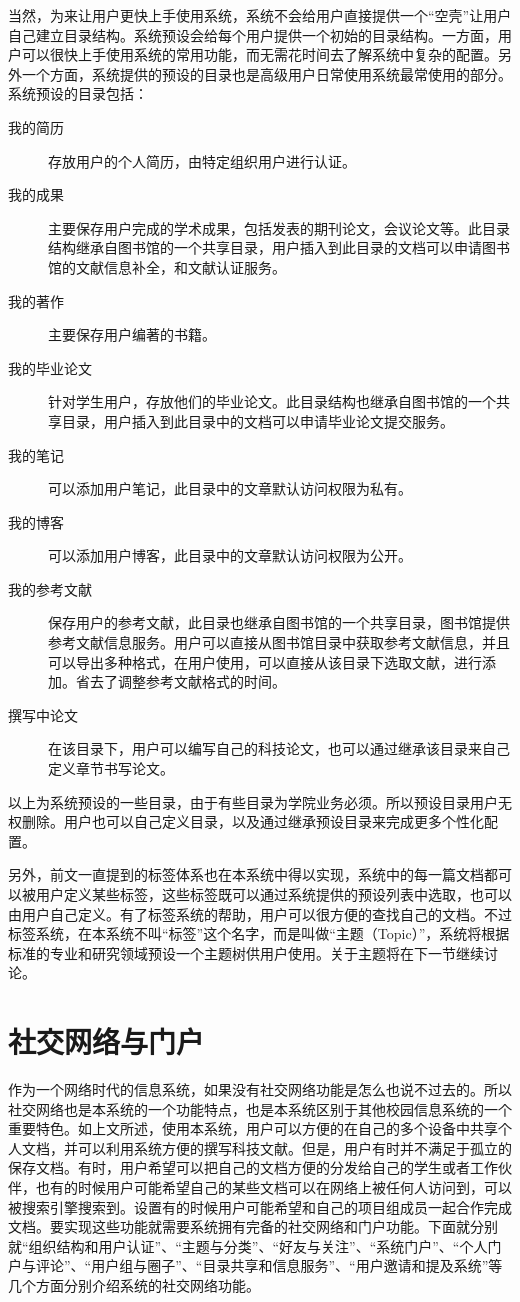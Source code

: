 当然，为来让用户更快上手使用系统，系统不会给用户直接提供一个“空壳”让用户自己建立目录结构。系统预设会给每个用户提供一个初始的目录结构。一方面，用户可以很快上手使用系统的常用功能，而无需花时间去了解系统中复杂的配置。另外一个方面，系统提供的预设的目录也是高级用户日常使用系统最常使用的部分。系统预设的目录包括：
\begin{description}
\item[我的简历] 存放用户的个人简历，由特定组织用户进行认证。
\item[我的成果] 主要保存用户完成的学术成果，包括发表的期刊论文，会议论文等。此目录结构继承自图书馆的一个共享目录，用户插入到此目录的文档可以申请图书馆的文献信息补全，和文献认证服务。
\item[我的著作] 主要保存用户编著的书籍。
\item[我的毕业论文] 针对学生用户，存放他们的毕业论文。此目录结构也继承自图书馆的一个共享目录，用户插入到此目录中的文档可以申请毕业论文提交服务。
\item[我的笔记] 可以添加用户笔记，此目录中的文章默认访问权限为私有。
\item[我的博客] 可以添加用户博客，此目录中的文章默认访问权限为公开。
\item[我的参考文献] 保存用户的参考文献，此目录也继承自图书馆的一个共享目录，图书馆提供参考文献信息服务。用户可以直接从图书馆目录中获取参考文献信息，并且可以导出多种格式，在用户使用，可以直接从该目录下选取文献，进行添加。省去了调整参考文献格式的时间。
\item[撰写中论文] 在该目录下，用户可以编写自己的科技论文，也可以通过继承该目录来自己定义章节书写论文。
\end{description}
以上为系统预设的一些目录，由于有些目录为学院业务必须。所以预设目录用户无权删除。用户也可以自己定义目录，以及通过继承预设目录来完成更多个性化配置。

另外，前文一直提到的标签体系也在本系统中得以实现，系统中的每一篇文档都可以被用户定义某些标签，这些标签既可以通过系统提供的预设列表中选取，也可以由用户自己定义。有了标签系统的帮助，用户可以很方便的查找自己的文档。不过标签系统，在本系统不叫“标签”这个名字，而是叫做“主题（Topic）”，系统将根据标准的专业和研究领域预设一个主题树供用户使用。关于主题将在下一节继续讨论。

\section{社交网络与门户}
\label{sec:society}

作为一个网络时代的信息系统，如果没有社交网络功能是怎么也说不过去的。所以社交网络也是本系统的一个功能特点，也是本系统区别于其他校园信息系统的一个重要特色。如上文所述，使用本系统，用户可以方便的在自己的多个设备中共享个人文档，并可以利用系统方便的撰写科技文献。但是，用户有时并不满足于孤立的保存文档。有时，用户希望可以把自己的文档方便的分发给自己的学生或者工作伙伴，也有的时候用户可能希望自己的某些文档可以在网络上被任何人访问到，可以被搜索引擎搜索到。设置有的时候用户可能希望和自己的项目组成员一起合作完成文档。要实现这些功能就需要系统拥有完备的社交网络和门户功能。下面就分别就“组织结构和用户认证”、“主题与分类”、“好友与关注”、“系统门户”、“个人门户与评论”、“用户组与圈子”、“目录共享和信息服务”、“用户邀请和提及系统”等几个方面分别介绍系统的社交网络功能。

